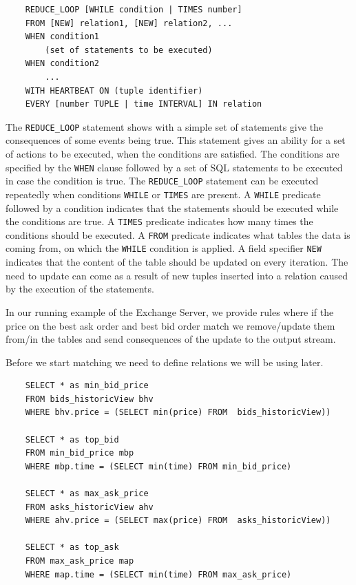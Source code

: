\documentclass{article}
\begin{document}
\begin{verbatim}
    REDUCE_LOOP [WHILE condition | TIMES number]
    FROM [NEW] relation1, [NEW] relation2, ... 
    WHEN condition1
        (set of statements to be executed)
    WHEN condition2
        ...
    WITH HEARTBEAT ON (tuple identifier)
    EVERY [number TUPLE | time INTERVAL] IN relation 
\end{verbatim}

The {\tt REDUCE\_LOOP} statement shows with a simple set of statements give the consequences of some events being true. This statement gives an ability for a set of actions to be executed, when the conditions are satisfied. The conditions are specified by the {\tt WHEN} clause followed by a set of SQL statements to be executed in case the condition is true. The {\tt REDUCE\_LOOP} statement can be executed repeatedly when conditions {\tt WHILE} or {\tt TIMES} are present. A {\tt WHILE} predicate followed by a condition indicates that the statements should be executed while the conditions are true. A {\tt TIMES} predicate indicates how many times the conditions should be executed. A {\tt FROM} predicate indicates what tables the data is coming from, on which the {\tt WHILE} condition is applied. A field specifier {\tt NEW} indicates that the content of the table should be updated on every iteration. The need to update can come as a result of new tuples inserted into a relation caused by the execution of the statements.   

In our running example of the Exchange Server, we provide rules where if the price on the best ask order and best bid order match we remove/update them from/in the tables and send consequences of the update to the output stream.

Before we start matching we need to define relations we will be using later.

\begin{verbatim}      
    SELECT * as min_bid_price
    FROM bids_historicView bhv
    WHERE bhv.price = (SELECT min(price) FROM  bids_historicView))
    
    SELECT * as top_bid
    FROM min_bid_price mbp
    WHERE mbp.time = (SELECT min(time) FROM min_bid_price)
    
    SELECT * as max_ask_price
    FROM asks_historicView ahv
    WHERE ahv.price = (SELECT max(price) FROM  asks_historicView))
    
    SELECT * as top_ask
    FROM max_ask_price map
    WHERE map.time = (SELECT min(time) FROM max_ask_price)
\end{verbatim}
\end{document}
